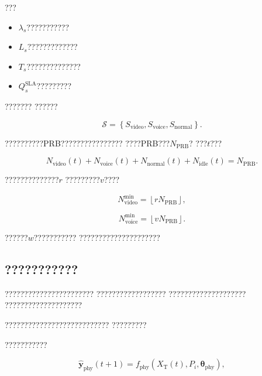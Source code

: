 ???

\begin{itemize}
    \item $\lambda_s$???????????
    \item $L_s$?????????????
    \item $T_s$??????????????
    \item $Q_s^{\mathrm{SLA}}$?????????
\end{itemize}

???????
??????

\begin{equation}
\mathcal{S}
=
\left\{
S_{\mathrm{video}},
S_{\mathrm{voice}},
S_{\mathrm{normal}}
\right\}.
\label{eq:service_type_set}
\end{equation}

??????????PRB????????????????
????PRB???$N_{\mathrm{PRB}}$?
???$t$???

\begin{equation}
N_{\mathrm{video}}(t)
+
N_{\mathrm{voice}}(t)
+
N_{\mathrm{normal}}(t)
+
N_{\mathrm{idle}}(t)
=
N_{\mathrm{PRB}}.
\label{eq:prb_resource_conservation}
\end{equation}

??????????????$r$
?????????$v$????

\begin{equation}
N_{\mathrm{video}}^{\min}
=
\left\lfloor
rN_{\mathrm{PRB}}
\right\rfloor,
\label{eq:video_reserved_prb_number}
\end{equation}

\begin{equation}
N_{\mathrm{voice}}^{\min}
=
\left\lfloor
vN_{\mathrm{PRB}}
\right\rfloor.
\label{eq:voice_protected_prb_number}
\end{equation}

??????$w$???????????
?????????????????????


\subsection*{???????????}

???????????????????????
??????????????????
????????????????????
????????????????????

???????????????????????????
?????????

???????????

\begin{equation}
\hat{\boldsymbol{y}}_{\mathrm{phy}}(t+1)
=
f_{\mathrm{phy}}
\left(
X_{\mathrm{T}}(t),
P_i,
\boldsymbol{\theta}_{\mathrm{phy}}
\right),
\label{eq:physics_model_output}
\end{equation}

